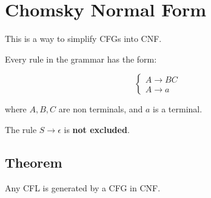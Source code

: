 \documentclass{article}
\begin{document}
\section*{Chomsky Normal Form}

This is a way to simplify CFGs into CNF.

Every rule in the grammar has the form:

\[
\begin{cases}
A\rightarrow B C \\
A \rightarrow a
\end{cases}
\]

where $A,B,C$ are non terminals, and $a$ is a terminal.

The rule $S\rightarrow\epsilon$ is \textbf{not excluded}.

\subsection*{Theorem}

Any CFL is generated by a CFG in CNF.
\end{document}
